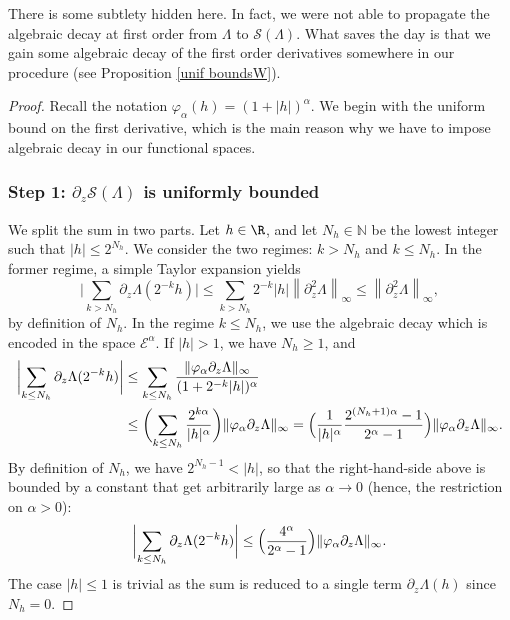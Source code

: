 \documentclass[JEP,XML,SOM,Unicode]{cedram}
\let\mathcal\mathscr
\newcommand{\cS}{\mathcal{S}}
\theoremstyle{plain}
\theoremstyle{definition}
\newcommand{\N}{\mathbb{N}}
\let\ds\displaystyle
\newcommand{\abs}[1]{\left\lvert#1\right\rvert}
\newcommand{\bbabs}[1]{\biggl\lvert#1\biggr\rvert}
\newcommand{\Ea}{\mathcal{E}^\alpha}
\newcommand{\vphia}{\varphi_\alpha}
\begin{document}
There is some subtlety hidden here. In fact, we were not able to propagate the algebraic decay at first order from $\Lambda$ to $\cS(\Lambda)$. What saves the day is that we gain some algebraic decay of the first order derivatives somewhere in our procedure (see \eg Proposition \ref{unif boundsW}).

\begin{proof}
Recall the notation $\vphia (h)= (1 + \abs{h})^\alpha$. We begin with the uniform bound on the first derivative, which is the main reason why we have to impose algebraic decay in our functional spaces.

\subsubsection*{Step 1: $ \partial_z \cS(\Lambda)$ is uniformly bounded}
We split the sum in two parts. Let $h \in \R$, and let $N_h \in \N$ be the lowest integer such that $|h| \leq 2^{N_h}$.
We consider the two regimes: $k> N_h$ and $k \leq N_h$. In the former regime, a simple Taylor expansion yields
\begin{equation*}
\ds \bbabs{\sum_{k > N_h} \partial_z \Lambda (2^{-k}h)} \leq \ds \sum_{k > N_h} 2^{-k}| h | \left \|\partial_z^2 \Lambda \right \|_{\infty} \leq \left \|\partial_z^2 \Lambda \right \|_{\infty},
\end{equation*}
by definition of $N_h$.
In the regime $k \leq N_h $, we use the algebraic decay which is encoded in the space $\Ea$. If $|h|>1$, we have $N_h\geq 1$, and
\begin{align*}
\biggl | \sum_{k\leq N_h} \partial_z \Lambda (2^{-k}h)\biggr| &\leq \sum_{k\leq N_h } \frac{\|\vphia \partial_z \Lambda \|_{\infty}} {(1+2^{-k}|h|)^\alpha}\\
&\leq \biggl (\sum_{k\leq N_h } \dfrac{2^{k \alpha}}{|h|^\alpha} \biggr) \|\vphia \partial_z \Lambda \|_{\infty} = \Bigl (\dfrac{1}{|h|^\alpha} \dfrac{2^{(N_h+1) \alpha }-1}{2^\alpha-1} \Bigr) \|\vphia \partial_z \Lambda \|_{\infty}.
\end{align*}
By definition of $N_h$, we have $2^{N_h-1} < |h|$, so that the right-hand-side above is bounded by a constant that get arbitrarily large as $\alpha\to 0$ (hence, the restriction on $\alpha>0$):
\begin{equation}\label{eq:alpha collapses}
\bbabs{ \sum_{k\leq N_h} \partial_z \Lambda (2^{-k}h) } \leq \Bigl (\dfrac{4^\alpha}{2^\alpha - 1} \Bigr) \|\vphia \partial_z \Lambda \|_{\infty}.
\end{equation}
The case $|h|\leq 1$ is trivial as the sum is reduced to a single term $\partial_z \Lambda (h)$ since $N_h = 0$.


\end{proof}
\end{document}
